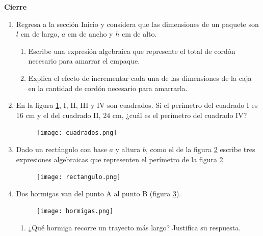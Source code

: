 \documentclass[11pt]{book}
\begin{document}
\begin{boxK}
  \begin{center}\textbf{Cierre}\end{center}

  \begin{enumerate}
    \item Regresa a la sección Inicio y considera que las dimensiones de un paquete son $l$ cm de largo, $a$ cm de ancho y $h$ cm de alto.
          \begin{enumerate}
            \item Escribe una expresión algebraica que represente el total
                  de cordón necesario para amarrar el empaque.
            \item Explica el efecto de incrementar cada una de las dimensiones de la caja en la cantidad de cordón necesario
                  para amarrarla.
          \end{enumerate}
    \item En la figura \ref{fig:cuadrados}, I, II, III y IV son cuadrados. Si el perímetro del cuadrado I es 16 cm y
          el del cuadrado II, 24 cm, ¿cuál es el perímetro del cuadrado IV?
          \begin{figure}[H]
            \centering
            \texttt{[image: cuadrados.png]}
            \label{fig:cuadrados}
          \end{figure}
    \item Dado un rectángulo con base $a$ y altura $b$, como el de la figura \ref{fig:rectangulo}
          escribe tres expresiones algebraicas que
          representen el perímetro de la figura \ref{fig:rectangulo}.
          \begin{figure}[H]
            \centering
            \texttt{[image: rectangulo.png]}
            \label{fig:rectangulo}
          \end{figure}
    \item Dos hormigas van del punto A al punto B (figura \ref{fig:hormigas}).
          \begin{figure}[H]
            \centering
            \texttt{[image: hormigas.png]}
            \label{fig:hormigas}
          \end{figure}
          \begin{enumerate}
            \item ¿Qué hormiga recorre un trayecto más largo? Justifica su respuesta.
          \end{enumerate}
  \end{enumerate}
\end{boxK}
\end{document}
